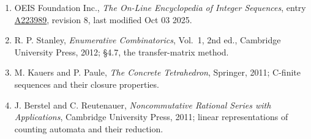 \documentclass[11pt]{article}
\theoremstyle{definition}
\begin{document}
\begin{enumerate}

\item OEIS Foundation Inc., \emph{The On-Line Encyclopedia of Integer Sequences}, entry \href{https://oeis.org/A223989}{A223989}, revision 8, last modified Oct 03 2025.

\item R. P. Stanley, \emph{Enumerative Combinatorics}, Vol.~1, 2nd ed., Cambridge University Press, 2012; \S4.7, the transfer-matrix method.

\item M. Kauers and P. Paule, \emph{The Concrete Tetrahedron}, Springer, 2011; C-finite sequences and their closure properties.

\item J. Berstel and C. Reutenauer, \emph{Noncommutative Rational Series with Applications}, Cambridge University Press, 2011; linear representations of counting automata and their reduction.

\end{enumerate}
\end{document}

